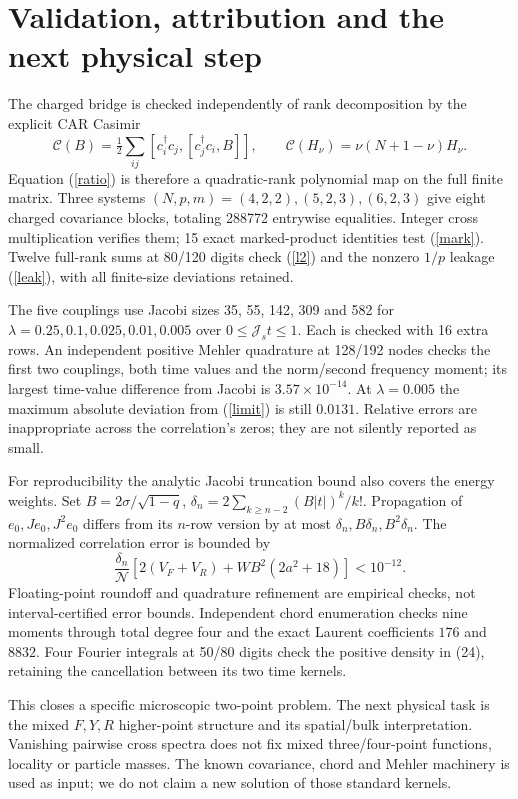 \documentclass[11pt,a4paper]{article}
\newcommand{\Js}{\mathcal J_s}
\begin{document}
\newpage
\section{Validation, attribution and the next physical step}
The charged bridge is checked independently of rank decomposition
by the explicit CAR Casimir
\[
 \mathcal C(B)=\tfrac12\sum_{ij}[c_i^\dagger c_j,[c_j^\dagger c_i,B]],
 \qquad \mathcal C(H_\nu)=\nu(N+1-\nu)H_\nu.
\]
Equation (\ref{ratio}) is therefore a quadratic-rank polynomial map
on the full finite matrix. Three systems $(N,p,m)=(4,2,2),(5,2,3),
(6,2,3)$ give eight charged covariance blocks, totaling 288772
entrywise equalities. Integer cross multiplication verifies them;
15 exact marked-product identities test (\ref{mark}). Twelve
full-rank sums at 80/120 digits check (\ref{l2}) and the nonzero
$1/p$ leakage (\ref{leak}), with all finite-size deviations retained.

The five couplings use Jacobi sizes 35, 55, 142, 309 and 582 for
$\lambda=0.25,0.1,0.025,0.01,0.005$ over $0\leq\Js t\leq1$.
Each is checked with 16 extra rows. An independent positive Mehler
quadrature at 128/192 nodes checks the first two couplings, both
time values and the norm/second frequency moment; its largest
time-value difference from Jacobi is $3.57\times10^{-14}$.
At $\lambda=0.005$ the maximum absolute deviation from
(\ref{limit}) is still $0.0131$. Relative errors are inappropriate
across the correlation's zeros; they are not silently reported as small.

For reproducibility the analytic Jacobi truncation bound also covers
the energy weights. Set $B=2\sigma/\sqrt{1-q}$,
$\delta_n=2\sum_{k\geq n-2}(B|t|)^k/k!$.
Propagation of $e_0,Je_0,J^2e_0$ differs from its $n$-row version by
at most $\delta_n,B\delta_n,B^2\delta_n$. The normalized correlation
error is bounded by
\[
 \frac{\delta_n}{\mathcal N}
 [2(V_F+V_R)+WB^2(2a^2+18)]<10^{-12}.
\]
Floating-point roundoff and quadrature refinement are empirical
checks, not interval-certified error bounds.
Independent chord enumeration checks nine moments through total
degree four and the exact Laurent coefficients $176$ and $8832$.
Four Fourier integrals at 50/80 digits check the positive density
in (24), retaining the cancellation between its two time kernels.

This closes a specific microscopic two-point problem. The next
physical task is the mixed $F,Y,R$ higher-point structure and its
spatial/bulk interpretation. Vanishing pairwise cross spectra does
not fix mixed three/four-point functions, locality or particle masses.
The known covariance, chord and Mehler machinery is used as input;
we do not claim a new solution of those standard kernels.
\end{document}
